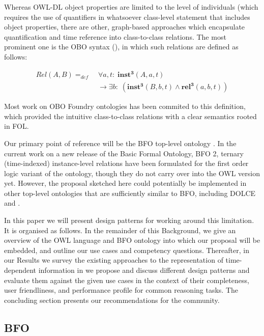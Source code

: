 \documentclass[10pt]{bmc_article}
\newcommand{\mirel}[1]{\ensuremath{\mathrm{\mathbf{#1}}}}
\newcommand{\mclass}[1]{\ensuremath{\mathit{#1}}}
\newcommand{\mrel}[2]{\mirel{#1^#2}}
\newcommand{\mrelt}[1]{\mrel{#1}{3}}
\newenvironment{bmcformat}{\baselineskip20pt\sloppy\setboolean{publ}{false}}{\baselineskip20pt\sloppy}
\begin{document}
\begin{bmcformat}
Whereas OWL-DL object properties are limited to the level of individuals (which 
requires the use of quantifiers in whatsoever class-level statement that includes
object properties, there are other, graph-based approaches which encapsulate quantification
and time reference into class-to-class relations. The most prominent one is 
the OBO syntax (\cite{OBO:RO}), in which such relations are defined as follows:

\begin{equation}
\begin{split}
\mclass{Rel}(\mclass{A},\mclass{B}) =_{def}&\;
\forall a, t:\; \mrelt{inst}(\mclass{A}, a, t) \\
&\ \rightarrow
\exists b:\;(\mrelt{inst}(\mclass{B},b,t) \wedge
\mrelt{rel}(a,b,t))
\end{split}
\label{eq:obo}
\end{equation}
 
Most work on OBO Foundry ontologies has been commited to this definition, which provided 
the intuitive class-to-class relations with a clear semantics rooted in FOL. 


Our primary point of reference will be the BFO top-level ontology \cite{BFO2:Graz}. 
In the current work on a new release of the Basic
Formal Ontology, BFO 2, ternary (time-indexed) instance-level relations have
been formulated for the first order logic variant of the ontology, though they
do not carry over into the OWL version yet.
However, the proposal sketched here could potentially be implemented in other top-level
ontologies that are sufficiently similar to BFO, including DOLCE \cite{DOLCE:ref} and \cite{GFO:ref}.

In this paper we will present design patterns for working around this limitation. It is organised as follows.
In the remainder of this Background, we give an overview of the OWL language and BFO ontology into which our proposal will be embedded, and outline our use cases and competency questions. 
Thereafter, in our Results we survey the existing approaches to the representation of time-dependent information in 
we propose and discuss different design patterns and evaluate them against the given use cases in the context of their completeness, user friendliness, and performance profile for common reasoning tasks.
The concluding section presents our recommendations for the community.

\subsection*{BFO}


\end{bmcformat}
\end{document}
